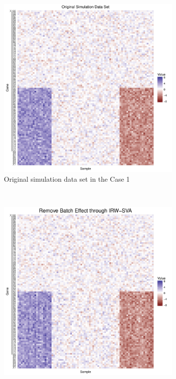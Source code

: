 \documentclass[11pt]{article}
\begin{document}
\begin{figure}[h!]
    \centering
    \begin{subfigure}[b]{0.3\textwidth}
        \centering
        \includegraphics[width = \textwidth]{figures/simulate1.pdf}
        \caption{Original simulation data set in the Case 1}
        \label{fig:data1}
    \end{subfigure}%
~
    \begin{subfigure}[b]{0.3\textwidth}
        \centering
        \includegraphics[width = \textwidth]{figures/sva1.pdf}

\end{subfigure}
\end{figure}
\end{document}
